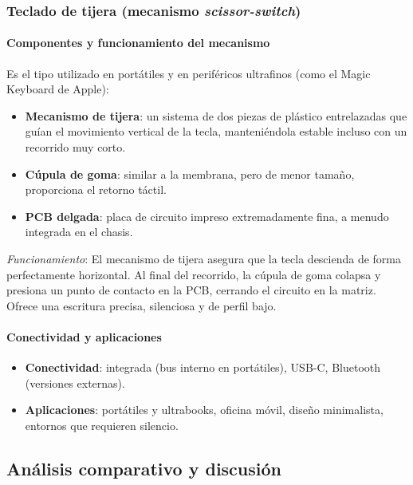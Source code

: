 \documentclass[12pt, letterpaper]{article}
\begin{document}
\subsubsection{Teclado de tijera (mecanismo \textit{scissor-switch})}

\paragraph{Componentes y funcionamiento del mecanismo}
Es el tipo utilizado en portátiles y en periféricos ultrafinos (como el Magic Keyboard de Apple):
\begin{itemize}
    \item \textbf{Mecanismo de tijera}: un sistema de dos piezas de plástico entrelazadas que guían el movimiento vertical de la tecla, manteniéndola estable incluso con un recorrido muy corto.
    \item \textbf{Cúpula de goma}: similar a la membrana, pero de menor tamaño, proporciona el retorno táctil.
    \item \textbf{PCB delgada}: placa de circuito impreso extremadamente fina, a menudo integrada en el chasis.
\end{itemize}
\textit{Funcionamiento}: El mecanismo de tijera asegura que la tecla descienda de forma perfectamente horizontal. Al final del recorrido, la cúpula de goma colapsa y presiona un punto de contacto en la PCB, cerrando el circuito en la matriz. Ofrece una escritura precisa, silenciosa y de perfil bajo.

\paragraph{Conectividad y aplicaciones}
\begin{itemize}
    \item \textbf{Conectividad}: integrada (bus interno en portátiles), USB-C, Bluetooth (versiones externas).
    \item \textbf{Aplicaciones}: portátiles y ultrabooks, oficina móvil, diseño minimalista, entornos que requieren silencio.
\end{itemize}

\subsection{Análisis comparativo y discusión}
\FloatBarrier
\end{document}
